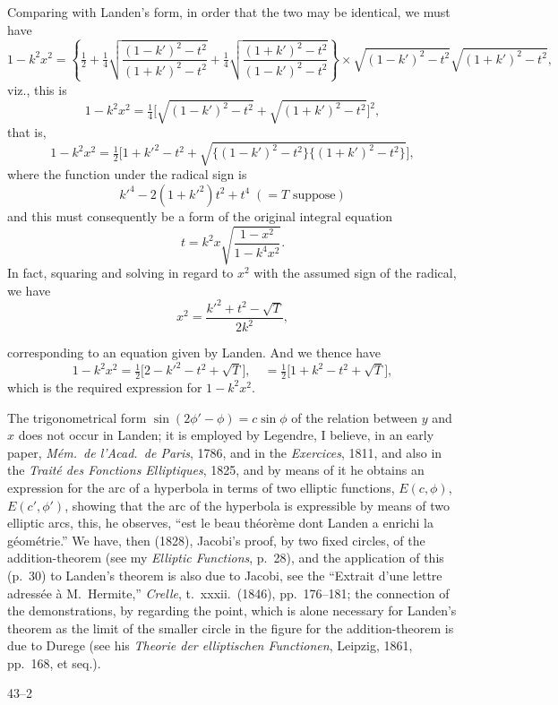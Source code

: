 \documentclass[11pt,a4paper]{article}
\begin{document}
Comparing with Landen's form, in order that the two may be identical,
we must have
\[
  1-k^{2}x^{2}=\left\{\tfrac{1}{2}+\tfrac{1}{4}\sqrt{\frac{(1-k')^{2}-t^{2}}{(1+k')^{2}-t^{2}}}+\tfrac{1}{4}\sqrt{\frac{(1+k')^{2}-t^{2}}{(1-k')^{2}-t^{2}}}\right\}
  \times\sqrt{(1-k')^{2}-t^{2}}\sqrt{(1+k')^{2}-t^{2}},
\]
viz., this is
\[
  1-k^{2}x^{2}=\tfrac{1}{4}\bigl[\sqrt{(1-k')^{2}-t^{2}}+\sqrt{(1+k')^{2}-t^{2}}\bigr]^{2},
\]
that is,
\[
  1-k^{2}x^{2}=\tfrac{1}{2}\bigl[1+k'^{2}-t^{2}+\sqrt{\{(1-k')^{2}-t^{2}\}\{(1+k')^{2}-t^{2}\}}\bigr],
\]
where the function under the radical sign is
\[
  k'^{4}-2(1+k'^{2})t^{2}+t^{4}\;(=T\text{ suppose})
\]
and this must consequently be a form of the original integral equation
\[
  t=k^{2}x\sqrt{\frac{1-x^{2}}{1-k^{4}x^{2}}}.
\]
In fact, squaring and solving in regard to $x^{2}$ with the assumed
sign of the radical, we have
\[
  x^{2}=\frac{k'^{2}+t^{2}-\sqrt{T}}{2k^{2}},
\]

\newpage
\noindent
corresponding to an equation given by Landen. And we thence have
\[
  1-k^{2}x^{2}=\tfrac{1}{2}\bigl[2-k'^{2}-t^{2}+\sqrt{T}\bigr],\quad =\tfrac{1}{2}\bigl[1+k^{2}-t^{2}+\sqrt{T}\bigr],
\]
which is the required expression for $1-k^{2}x^{2}$.

The trigonometrical form $\sin(2\phi'-\phi)=c\sin\phi$ of the relation
between $y$ and $x$ does not occur in Landen; it is employed by
Legendre, I believe, in an early paper, \textit{M\'em.\ de l'Acad.\ de
Paris}, 1786, and in the \textit{Exercices}, 1811, and also in the
\textit{Trait\'e des Fonctions Elliptiques}, 1825, and by means of it
he obtains an expression for the arc of a hyperbola in terms of two
elliptic functions, $E(c,\phi)$, $E(c',\phi')$, showing that the arc of
the hyperbola is expressible by means of two elliptic arcs, this, he
observes, ``est le beau th\'eor\`eme dont Landen a enrichi la
g\'eom\'etrie.'' We have, then (1828), Jacobi's proof, by two fixed
circles, of the addition-theorem (see my \textit{Elliptic Functions},
p.~28), and the application of this (p.~30) to Landen's theorem is also
due to Jacobi, see the ``Extrait d'une lettre adress\'ee \`a
M.~Hermite,'' \textit{Crelle}, t.~xxxii.\ (1846), pp.\ 176--181; the
connection of the demonstrations, by regarding the point, which is alone
necessary for Landen's theorem as the limit of the smaller circle in
the figure for the addition-theorem is due to Durege (see his
\textit{Theorie der elliptischen Functionen}, Leipzig, 1861, pp.\ 168,
et seq.).

\hfill 43--2
\end{document}
